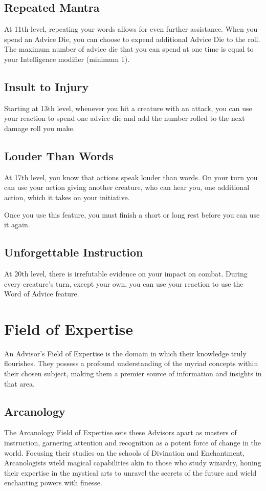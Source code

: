 \documentclass[letterpaper,openany,twoside,twocolumn]{book}
\begin{document}
	\subsection*{Repeated Mantra}
	At 11th level, repeating your words allows for even further assistance. When you spend an Advice Die, you can choose to expend additional Advice Die to the roll. The maximum number of advice die that you can spend at one time is equal to your Intelligence modifier (minimum 1).
	
	\subsection*{Insult to Injury}
	Starting at 13th level, whenever you hit a creature with an attack, you can use your reaction to spend one advice die and add the number rolled to the next damage roll you make.
	
	\subsection*{Louder Than Words}
	At 17th level, you know that actions speak louder than words. On your turn you can use your action giving another creature, who can hear you, one additional action, which it takes on your initiative.
	
	Once you use this feature, you must finish a short or long rest before you can use it again.
	
	\subsection*{Unforgettable Instruction}
	At 20th level, there is irrefutable evidence on your impact on combat. During every creature's turn, except your own, you can use your reaction to use the Word of Advice feature.
	
	\section*{Field of Expertise}
	An Advisor's Field of Expertise is the domain in which their knowledge truly flourishes. They possess a profound understanding of the myriad concepts within their chosen subject, making them a premier source of information and insights in that area.
	
	\subsection*{Arcanology}
	The Arcanology Field of Expertise sets these Advisors apart as masters of instruction, garnering attention and recognition as a potent force of change in the world. Focusing their studies on the schools of Divination and Enchantment, Arcanologists wield magical capabilities akin to those who study wizardry, honing their expertise in the mystical arts to unravel the secrets of the future and wield enchanting powers with finesse.
	
\end{document}
